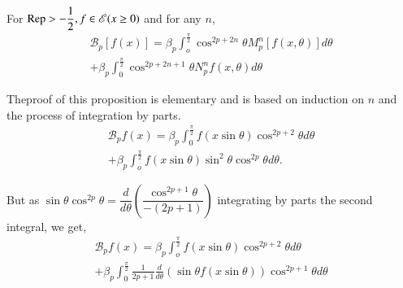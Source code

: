 \setcounter{proposition}{0}
\begin{proposition}\label{part1:chap3:sec3:prop1}%
  For $\operatorname{Rep} > - \dfrac{1}{2}, f \in \mathscr{E} (x \geq 0)$ and for any $n$, 
  \begin{multline*}
    \mathscr{B}_p [ f(x)] = \beta_p \int^{\frac{\pi}{2}}_o \cos^{2p
      + 2n} \theta  M^n_p [ f(x, \theta  )] d \theta \\ 
    + \beta_p
    \int^{\frac{\pi}{2}}_0 \cos^{2p + 2n + 1} \theta  N^n_p f(x,
    \theta  ) d \theta  \tag{1}\label{part1:chap3:sec3:eq1} 
  \end{multline*}
  
  The\pageoriginale proof of this proposition is elementary and is
  based on induction 
  on $n$ and the process of integration by parts. 
  \begin{multline*}
  \mathscr{B}_pf (x)= \beta_p \int^{\frac{\pi}{2}}_{0} f (x \sin\theta  )
  \cos^{2p+2}  \theta  d \theta \\ 
  + \beta_p \int^{\frac{\pi}{2}}_{o} f (x
  \sin \theta ) \sin^2 \theta  \cos^{2p} \theta  d \theta . 
  \end{multline*}
\end{proposition}

But as $\sin \theta  \cos^{2p} \theta  = \dfrac{d}{d \theta }
(\dfrac{\cos ^{2p +1} \theta }{- (2p+1)})$ integrating by parts the
second integral, we get, 
\begin{multline*}
  \mathscr{B}_pf (x) = \beta_p \int^{\frac{\pi}{2}}_{o} f (x \sin \theta  )
  \cos^{2p+2} \theta  d \theta \\ 
  + \beta_p
  \int^{\frac{\pi}{2}}_{0}\frac{1}{2p+1} \frac{d}{d \theta }  ( \sin
  \theta  f (x \sin \theta )) \cos^{2p+1} \theta  d \theta  
\end{multline*}

